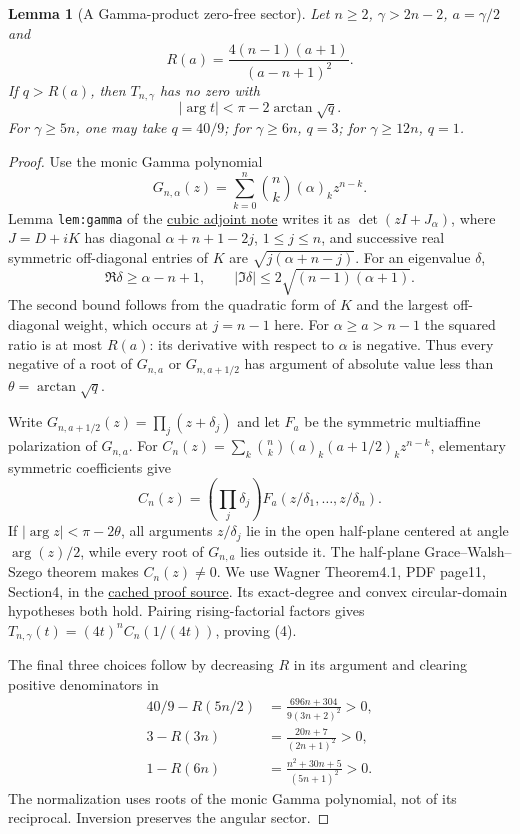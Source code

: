 \documentclass[11pt]{article}
\newtheorem{lemma}{Lemma}
\begin{document}
\begin{lemma}[A Gamma-product zero-free sector]\label{lem:moment-sector}
Let $n\ge2$, $\gamma>2n-2$, $a=\gamma/2$ and
\[
 R(a)=\frac{4(n-1)(a+1)}{(a-n+1)^2}.
\]
If $q>R(a)$, then $T_{n,\gamma}$ has no zero with
\[
 |\arg t|<\pi-2\arctan\sqrt q.                         \tag{4}
\]
For $\gamma\ge5n$, one may take $q=40/9$; for $\gamma\ge6n$,
$q=3$; for $\gamma\ge12n$, $q=1$.
\end{lemma}
\begin{proof}
Use the monic Gamma polynomial
\[
 G_{n,\alpha}(z)=\sum_{k=0}^n\binom nk(\alpha)_kz^{n-k}.
\]
Lemma \texttt{lem:gamma} of the
\href{CUBIC_ADJOINT_STABILITY_SFC.tex}{cubic adjoint note}
writes it as $\det(zI+J_\alpha)$, where $J=D+iK$ has diagonal
$\alpha+n+1-2j$, $1\le j\le n$, and successive real symmetric
off-diagonal entries of $K$ are $\sqrt{j(\alpha+n-j)}$.
For an eigenvalue $\delta$,
\[
 \Re\delta\ge\alpha-n+1,\qquad
 |\Im\delta|\le2\sqrt{(n-1)(\alpha+1)}.
\]
The second bound follows from the quadratic form of $K$ and the
largest off-diagonal weight, which occurs at $j=n-1$ here.
For $\alpha\ge a>n-1$ the squared ratio is at most $R(a)$:
its derivative with respect to $\alpha$ is negative.
Thus every negative of a root of $G_{n,a}$ or
$G_{n,a+1/2}$ has argument of absolute value less than
$\theta=\arctan\sqrt q$.

Write $G_{n,a+1/2}(z)=\prod_j(z+\delta_j)$ and let $F_a$ be
the symmetric multiaffine polarization of $G_{n,a}$.
For
$C_n(z)=\sum_k\binom nk(a)_k(a+1/2)_kz^{n-k}$,
elementary symmetric coefficients give
\[
 C_n(z)=\left(\prod_j\delta_j\right)
                      F_a(z/\delta_1,\ldots,z/\delta_n).
\]
If $|\arg z|<\pi-2\theta$, all arguments $z/\delta_j$ lie in the
open half-plane centered at angle $\arg(z)/2$, while every root
of $G_{n,a}$ lies outside it.
The half-plane Grace--Walsh--Szego theorem makes $C_n(z)\ne0$.
We use Wagner Theorem4.1, PDF page11, Section4, in the
\href{sources/wagner-multivariate-stable-polynomials-2011.pdf}{cached proof source}.
Its exact-degree and convex circular-domain hypotheses both hold.
Pairing rising-factorial factors gives
$T_{n,\gamma}(t)=(4t)^nC_n(1/(4t))$, proving (4).

The final three choices follow by decreasing $R$ in its argument
and clearing positive denominators in
\[
 \begin{split}
 40/9-R(5n/2)&=\frac{696n+304}{9(3n+2)^2}>0,\\
 3-R(3n)&=\frac{20n+7}{(2n+1)^2}>0,\\
 1-R(6n)&=\frac{n^2+30n+5}{(5n+1)^2}>0.
 \end{split}
\]
The normalization uses roots of the monic Gamma polynomial,
not of its reciprocal. Inversion preserves the angular sector.
\end{proof}
\end{document}
